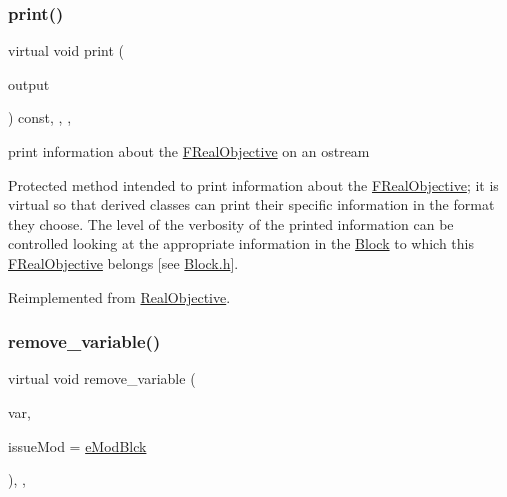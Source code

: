 \subsubsection{\texorpdfstring{print()}{print()}}
{\footnotesize\ttfamily virtual void print (\begin{DoxyParamCaption}\item[{std\+::ostream \&}]{output }\end{DoxyParamCaption}) const\hspace{0.3cm}{\ttfamily [inline]}, {\ttfamily [override]}, {\ttfamily [protected]}, {\ttfamily [virtual]}}



print information about the \mbox{\hyperlink{class_s_m_spp__di__unipi__it_1_1_f_real_objective}{F\+Real\+Objective}} on an ostream 

Protected method intended to print information about the \mbox{\hyperlink{class_s_m_spp__di__unipi__it_1_1_f_real_objective}{F\+Real\+Objective}}; it is virtual so that derived classes can print their specific information in the format they choose. The level of the verbosity of the printed information can be controlled looking at the appropriate information in the \mbox{\hyperlink{class_s_m_spp__di__unipi__it_1_1_block}{Block}} to which this \mbox{\hyperlink{class_s_m_spp__di__unipi__it_1_1_f_real_objective}{F\+Real\+Objective}} belongs \mbox{[}see \mbox{\hyperlink{_block_8h}{Block.\+h}}\mbox{]}. 

Reimplemented from \mbox{\hyperlink{class_s_m_spp__di__unipi__it_1_1_real_objective_a59a9fcbf8f9f86d348344b2073644b0e}{Real\+Objective}}.

\mbox{\label{class_s_m_spp__di__unipi__it_1_1_f_real_objective_ade52d9ebf47de895377b860ef4d3a607}} 
\subsubsection{\texorpdfstring{remove\+\_\+variable()}{remove\_variable()}}
{\footnotesize\ttfamily virtual void remove\+\_\+variable (\begin{DoxyParamCaption}\item[{\mbox{\hyperlink{class_s_m_spp__di__unipi__it_1_1_variable}{Variable}} $\ast$}]{var,  }\item[{\mbox{\hyperlink{group___modification___t_y_p_e_s_ga544246d8c462e9a2d817c2c30797968f}{c\+\_\+\+Mod\+Param}}}]{issue\+Mod = {\ttfamily \mbox{\hyperlink{group___modification___t_y_p_e_s_gga48fddcdd03a03f49b7e389ca1ed938d4a21b14b26b1c0093a0905f6fc010bad29}{e\+Mod\+Blck}}} }\end{DoxyParamCaption})\hspace{0.3cm}{\ttfamily [inline]}, {\ttfamily [override]}, {\ttfamily [virtual]}}



